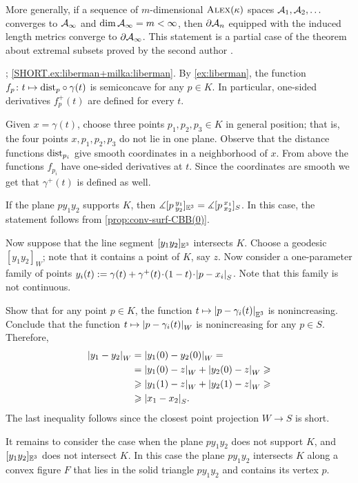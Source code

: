 More generally, if a sequence of $m$-dimensional $\textsc{Alex}(\kappa)$ spaces $\mathcal{A}_1,\mathcal{A}_2,\dots$ converges to $\mathcal{A}_\infty$ and $\operatorname{\rm dim}\nolimits \mathcal{A}_\infty=m<\infty$,
then $\partial \mathcal{A}_n$ equipped with the induced length metrics converge to  $\partial \mathcal{A}_\infty$.
This statement is a partial case of the theorem about extremal subsets proved by the second author \cite[1.2]{petrunin1997}.

\parbf{\ref{ex:liberman+milka}}; \ref{SHORT.ex:liberman+milka:liberman}.
By \ref{ex:liberman}, the function $f_p\colon t\mapsto \mathrm{dist}_p\circ\gamma(t)$ is semiconcave for any $p\in K$.
In particular, one-sided derivatives $f_p^+(t)$ are defined for every $t$.

Given $x=\gamma(t)$, choose three points $p_1,p_2,p_3\in K$ in general position;
that is, the four points $x,p_1,p_2,p_3$ do not lie in one plane.
Observe that the distance functions $\mathrm{dist}_{p_i}$ give smooth coordinates in a neighborhood of $x$.
From above the functions $f_{p_i}$ have one-sided derivatives at $t$.
Since the coordinates are smooth we get that $\gamma^+(t)$ is defined as well.

If the plane $py_1y_2$ supports $K$, then 
$\measuredangle[p\,{}^{y_1}_{y_2}]_{\mathbb{E}^3}=\measuredangle[p\,{}^{x_1}_{x_2}]_S$.
In this case, the statement follows from \ref{prop:conv-surf-CBB(0)}.

Now suppose that the line segment $[y_1y_2]_{\mathbb{E}^3}$ intersects $K$.
Choose a geodesic $[y_1y_2]_W$;
note that it contains a point of $K$, say $z$.
Now consider a one-parameter family of points 
$y_i(t)\df \gamma(t)+\gamma^+(t)\z\cdot (1-t)\z\cdot \dist{p}{x_i}{S}$.
Note that this family is not continuous.

Show that for any point $p\in K$, the function $t\mapsto |{p}-{\gamma_i(t)}|_{\mathbb{E}^3}^{{}}$ is nonincreasing.
Conclude that the function $t\mapsto |{p}-{\gamma_i(t)}|_{W}^{{}}$ is nonincreasing for any $p\in S$.
Therefore, 
\begin{align*}
|{y_1}-{y_2}|_{W}^{{}}
&=|{y_1(0)}-{y_2(0)}|_{W}^{{}}=
\\
&=|{y_1(0)}-{z}|_{W}^{{}}+|{y_2(0)}-{z}|_{W}^{{}}\geqslant
\\
&\geqslant|{y_1(1)}-{z}|_{W}^{{}}+|{y_2(1)}-{z}|_{W}^{{}}\geqslant 
\\
&\geqslant|{x_1}-{x_2}|_{S}^{{}}.
\end{align*}
The last inequality follows since the closest point projection $W\to S$ is short.

It remains to consider the case when the plane $py_1y_2$ does not support $K$,
and $[y_1y_2]_{\mathbb{E}^3}$ does not intersect $K$.
In this case the plane $py_1y_2$ intersects $K$ along a convex figure $F$ that lies in the solid triangle 
$py_1y_2$ and contains its vertex $p$.

